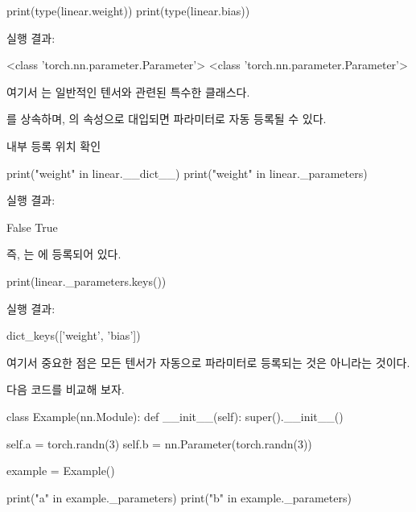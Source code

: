 \begin{dhkcode}
print(type(linear.weight))
print(type(linear.bias))
\end{dhkcode}

실행 결과:

\begin{dhkzsh}
<class 'torch.nn.parameter.Parameter'>
<class 'torch.nn.parameter.Parameter'>
\end{dhkzsh}

여기서 는 일반적인 텐서와 관련된 특수한 클래스다.

를 상속하며, 의 속성으로 대입되면 파라미터로 자동 등록될 수 있다.

\begin{dhknote}
\begin{dhksmry}[centered]
내부 등록 위치 확인
\end{dhksmry}
\end{dhknote}

\begin{dhkcode}
print("weight" in linear.__dict__)
print("weight" in linear._parameters)
\end{dhkcode}

실행 결과:

\begin{dhkzsh}
False
True
\end{dhkzsh}

즉, 는 에 등록되어 있다.

\begin{dhkcode}
print(linear._parameters.keys())
\end{dhkcode}

실행 결과:

\begin{dhkzsh}
dict_keys(['weight', 'bias'])
\end{dhkzsh}

여기서 중요한 점은 모든 텐서가 자동으로 파라미터로 등록되는 것은 아니라는 것이다.

다음 코드를 비교해 보자.

\begin{dhkcode}
class Example(nn.Module):
    def __init__(self):
        super().__init__()

        self.a = torch.randn(3)
        self.b = nn.Parameter(torch.randn(3))

example = Example()

print("a" in example._parameters)
print("b" in example._parameters)
\end{dhkcode}

